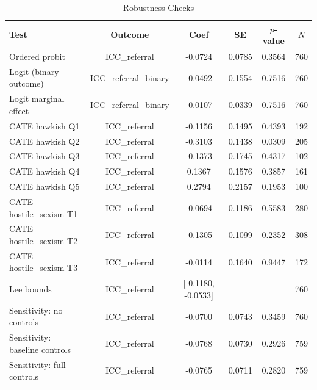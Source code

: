 \begin{table}[htbp]
\centering
\caption{Robustness Checks}
\label{tab:robustness}
\begin{tabular}{lccccc}
\hline\hline
Test & Outcome & Coef & SE & $p$-value & $N$ \\
\hline
Ordered probit & ICC\_referral & -0.0724 & 0.0785 & 0.3564 & 760 \\
Logit (binary outcome) & ICC\_referral\_binary & -0.0492 & 0.1554 & 0.7516 & 760 \\
Logit marginal effect & ICC\_referral\_binary & -0.0107 & 0.0339 & 0.7516 & 760 \\
CATE hawkish Q1 & ICC\_referral & -0.1156 & 0.1495 & 0.4393 & 192 \\
CATE hawkish Q2 & ICC\_referral & -0.3103 & 0.1438 & 0.0309 & 205 \\
CATE hawkish Q3 & ICC\_referral & -0.1373 & 0.1745 & 0.4317 & 102 \\
CATE hawkish Q4 & ICC\_referral & 0.1367 & 0.1576 & 0.3857 & 161 \\
CATE hawkish Q5 & ICC\_referral & 0.2794 & 0.2157 & 0.1953 & 100 \\
CATE hostile\_sexism T1 & ICC\_referral & -0.0694 & 0.1186 & 0.5583 & 280 \\
CATE hostile\_sexism T2 & ICC\_referral & -0.1305 & 0.1099 & 0.2352 & 308 \\
CATE hostile\_sexism T3 & ICC\_referral & -0.0114 & 0.1640 & 0.9447 & 172 \\
Lee bounds & ICC\_referral & [-0.1180, -0.0533] &  &  & 760 \\
Sensitivity: no controls & ICC\_referral & -0.0700 & 0.0743 & 0.3459 & 760 \\
Sensitivity: baseline controls & ICC\_referral & -0.0768 & 0.0730 & 0.2926 & 759 \\
Sensitivity: full controls & ICC\_referral & -0.0765 & 0.0711 & 0.2820 & 759 \\
\hline\hline
\end{tabular}
\end{table}
